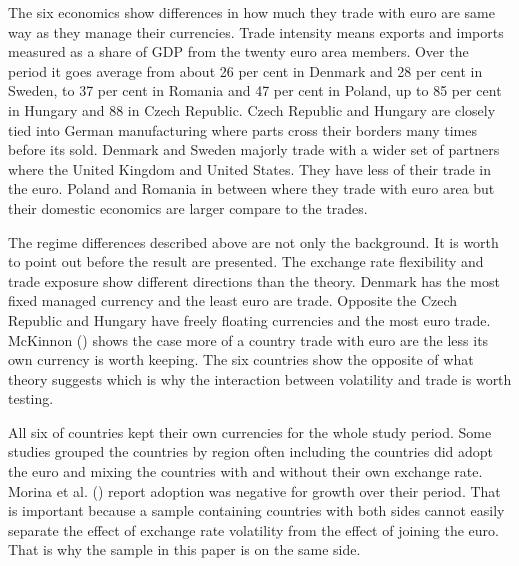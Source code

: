 The six economics show differences in how much they trade with euro are same way as they manage their currencies.
Trade intensity means exports and imports measured as a share of GDP from the twenty euro area members.
Over the period it goes average from about 26 per cent in Denmark and 28 per cent in Sweden, to 37 per cent in Romania and 47 per cent in Poland, up to 85 per cent in Hungary and 88 in Czech Republic.
Czech Republic and Hungary are closely tied into German manufacturing where parts cross their borders many times before its sold.
Denmark and Sweden majorly trade with a wider set of partners where the United Kingdom and United States.
They have less of their trade in the euro.
Poland and Romania in between where they trade with euro area but their domestic economics are larger compare to the trades.

\vspace{\baselineskip}

The regime differences described above are not only the background.
It is worth to point out before the result are presented.
The exchange rate flexibility and trade exposure show different directions than the theory.
Denmark has the most fixed managed currency and the least euro are trade.
Opposite the Czech Republic and Hungary have freely floating currencies and the most euro trade.
McKinnon (\citeyear{mckinnon_optimum_1963}) shows the case more of a country trade with euro are the less its own currency is worth keeping.
The six countries show the opposite of what theory suggests which is why the interaction between volatility and trade is worth testing.

\vspace{\baselineskip}
All six of countries kept their own currencies for the whole study period.
Some studies grouped the countries by region often including the countries did adopt the euro and mixing the countries with and without their own exchange rate.
Morina et al. (\citeyear{morina_effect_2020}) report adoption was negative for growth over their period.
That is important because a sample containing countries with both sides cannot easily separate the effect of exchange rate volatility from the effect of joining the euro.
That is why the sample in this paper is on the same side.

\vspace{\baselineskip}

